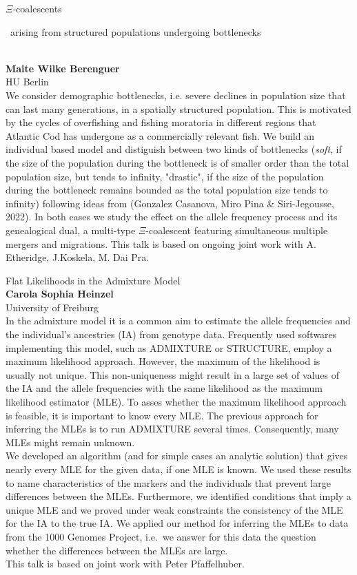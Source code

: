 \documentclass[12pt,a4paper]{article}
\newcommand{\ZAbst}{\rule[-1ex]{0pt}{2ex}\ } %
\begin{document}
{\Large $\Xi$-coalescents\ZAbst arising from structured populations undergoing bottlenecks}\\[1ex]
{\large 
\textbf{Maite Wilke Berenguer}\\[1ex] HU Berlin}\\[2ex]
We consider demographic bottlenecks, i.e. severe declines in population size that can last many generations, in a spatially structured population. This is motivated by the cycles of overfishing and fishing moratoria in different regions that Atlantic Cod has undergone as a commercially relevant fish. We build an individual based model and distiguish between two kinds of bottlenecks ({\em soft}, if the size of the population during the bottleneck is of smaller order than the total population size, but tends to infinity, "drastic", if the size of the population during the bottleneck remains bounded as the total population size tends to infinity) following ideas from (Gonzalez Casanova, Miro Pina \& Siri-Jegousse, 2022). In both cases we study the effect on the allele frequency process and its genealogical dual, a multi-type $\Xi$-coalescent featuring simultaneous multiple mergers and migrations.
This talk is based on ongoing joint work with A. Etheridge, J.Koskela, M. Dai Pra.
\bigskip \bigskip  %

\enlargethispage{1cm}
\noindent
{\Large Flat Likelihoods in the Admixture Model}\\[1ex]
{\large 
\textbf{Carola Sophia Heinzel}\\[1ex] University of Freiburg}\\[2ex]
In the admixture model it is a common aim to estimate the allele frequencies and the individual’s ancestries (IA) from genotype data. Frequently used softwares implementing this model, such as {\sc ADMIXTURE} or {\sc STRUCTURE}, employ a maximum likelihood approach. However, the maximum of the likelihood is usually not unique. This non-uniqueness might result in a large set of values of the IA and the allele frequencies with the same likelihood as the maximum likelihood estimator (MLE). To asses whether the maximum likelihood approach is feasible, it is important to know every MLE. The previous approach for inferring the MLEs is to run ADMIXTURE several times. Consequently, many MLEs might remain unknown.  
\\
We developed an algorithm (and for simple cases an analytic solution) that gives nearly every MLE for the given data, if one MLE is known. We used these results to name characteristics of the markers and the individuals that prevent large differences between the MLEs. Furthermore, we identified conditions that imply a unique MLE and we proved under weak constraints the consistency of the MLE for the IA to the true IA. We applied our method for inferring the MLEs to data from the 1000 Genomes Project, i.e.\ we answer for this data the question whether the differences between the MLEs are large. 
\\
This talk is based on joint work with Peter Pfaffelhuber.
\end{document}
